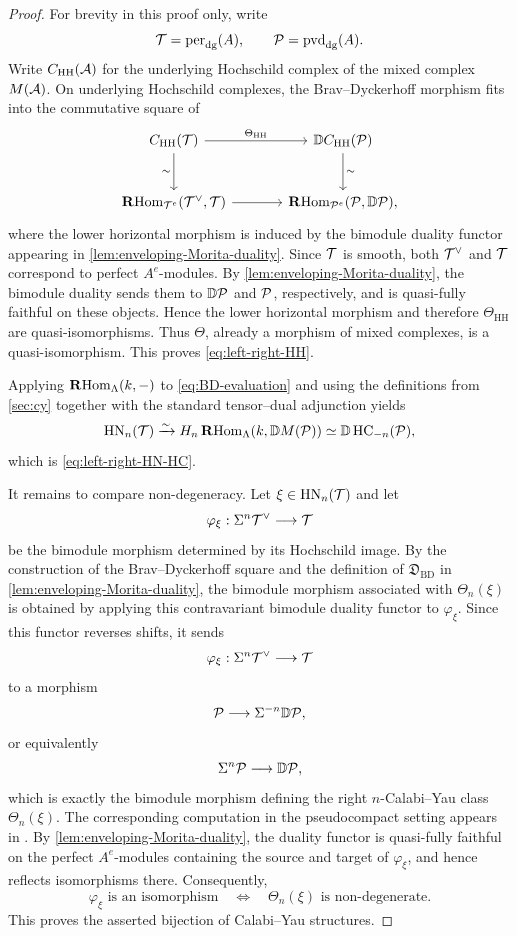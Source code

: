 \documentclass[11pt,a4paper,dvipsnames,x11names]{amsart}
\begin{document}
\begin{proof}
For brevity in this proof only, write
\[
\mathcal T=\operatorname{per}_{\mathrm{dg}}(A),\qquad \mathcal P=\operatorname{pvd}_{\mathrm{dg}}(A).
\]
Write $C_{\mathrm{HH}}(\mathcal A)$ for the underlying Hochschild complex of the mixed complex $M(\mathcal A)$. On underlying Hochschild complexes, the Brav--Dyckerhoff morphism fits into the commutative square of \cite[Theorem~3.1]{BravDyckerhoff19}
\[
\begin{tikzcd}[column sep=large,row sep=large]
C_{\mathrm{HH}}(\Tdg) \ar[r,"\Theta_{\mathrm{HH}}"] \ar[d,"\sim"'] & \DD C_{\mathrm{HH}}(\Pdg) \ar[d,"\sim"] \\
\RHom_{\Tdg^e}(\Tdg^{\vee},\Tdg) \ar[r] & \RHom_{\Pdg^e}(\Pdg,\DD\Pdg),
\end{tikzcd}
\]
where the lower horizontal morphism is induced by the bimodule duality functor appearing in \cref{lem:enveloping-Morita-duality}. Since $\mathcal T$ is smooth, both $\mathcal T^{\vee}$ and $\mathcal T$ correspond to perfect $A^e$-modules. By \cref{lem:enveloping-Morita-duality}, the bimodule duality sends them to $\mathbb D\mathcal P$ and $\mathcal P$, respectively, and is quasi-fully faithful on these objects. Hence the lower horizontal morphism and therefore $\Theta_{\mathrm{HH}}$ are quasi-isomorphisms. Thus $\Theta$, already a morphism of mixed complexes, is a quasi-isomorphism. This proves \eqref{eq:left-right-HH}.

Applying $\operatorname{\mathbf{R}Hom}_{\Lambda}(k,-)$ to \eqref{eq:BD-evaluation} and using the definitions from \cref{sec:cy} together with the standard tensor--dual adjunction yields
\[
\operatorname{HN}_n(\mathcal T)
\xrightarrow{\sim}
H_n\operatorname{\mathbf{R}Hom}_{\Lambda}(k,\mathbb D M(\mathcal P))
\simeq
\mathbb D\operatorname{HC}_{-n}(\mathcal P),
\]
which is \eqref{eq:left-right-HN-HC}.

It remains to compare non-degeneracy. Let $\xi\in\operatorname{HN}_n(\mathcal T)$ and let
\[
\varphi_{\xi}:\Sigma^n\mathcal T^{\vee}\longrightarrow\mathcal T
\]
be the bimodule morphism determined by its Hochschild image. By the construction of the Brav--Dyckerhoff square and the definition of $\mathfrak D_{\mathrm{BD}}$ in \cref{lem:enveloping-Morita-duality}, the bimodule morphism associated with $\Theta_n(\xi)$ is obtained by applying this contravariant bimodule duality functor to $\varphi_{\xi}$. Since this functor reverses shifts, it sends
\[
\varphi_{\xi}:\Sigma^n\mathcal T^{\vee}\longrightarrow\mathcal T
\]
to a morphism
\[
\mathcal P\longrightarrow \Sigma^{-n}\mathbb D\mathcal P,
\]
or equivalently
\[
\Sigma^n\mathcal P\longrightarrow \mathbb D\mathcal P,
\]
which is exactly the bimodule morphism defining the right $n$-Calabi--Yau class $\Theta_n(\xi)$. The corresponding computation in the pseudocompact setting appears in \cite[Proposition~4.4.1]{KellerLiuAmiot24}. By \cref{lem:enveloping-Morita-duality}, the duality functor is quasi-fully faithful on the perfect $A^e$-modules containing the source and target of $\varphi_{\xi}$, and hence reflects isomorphisms there. Consequently,
\[
\varphi_{\xi}\text{ is an isomorphism}
\quad\Longleftrightarrow\quad
\Theta_n(\xi)\text{ is non-degenerate}.
\]
This proves the asserted bijection of Calabi--Yau structures.
\end{proof}
\end{document}
